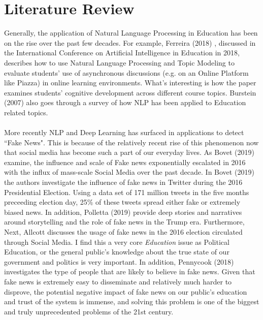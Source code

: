 \documentclass[12pt, final]{article}
\begin{document}
\section{Literature Review}
Generally, the application of Natural Language Processing in Education has been on the rise over the past few decades. For example, Ferreira (2018) \cite{Ferreira}, discussed in the International Conference on Artificial Intelligence in Education in 2018, describes how to use Natural Language Processing and Topic Modeling to evaluate students' use of asynchronous discussions (e.g. on an Online Platform like Piazza) in online learning environments. What's interesting is how the paper examines students' cognitive development across different course topics. Burstein (2007) \cite{Burstein} also goes through a survey of how NLP has been applied to Education related topics.
\\
\\
More recently NLP and Deep Learning has surfaced in applications to detect ``Fake News". This is because of the relatively recent rise of this phenomenon now that social media has become such a part of our everyday lives. As Bovet (2019) \cite{Bovet} examine, the influence and scale of Fake news exponentially escalated in 2016 with the influx of mass-scale Social Media over the past decade. In Bovet (2019) \cite{Bovet} the authors investigate the influence of fake news in Twitter during the 2016 Presidential Election. Using a data set of 171 million tweets in the five months preceeding election day, 25\% of these tweets spread either fake or extremely biased news. In addition, Polletta (2019) \cite{Polletta} provide deep stories and narratives around storytelling and the role of fake news in the Trump era. Furthermore, Next,  Allcott \cite{Allcott} discusses the usage of fake news in the 2016 election circulated through Social Media. I find this a very core \textit{Education} issue as Political Education, or the general public's knowledge about the true state of our government and politics is very important. In addition, Pennycook (2018) \cite{Pennycook} investigates the type of people that are likely to believe in fake news. Given that fake news is extremely easy to disseminate and relatively much harder to disprove, the potential negative impact of fake news on our public's education and trust of the system is immense, and solving this problem is one of the biggest and truly unprecedented problems of the 21st century.
\\
\\
\end{document}

